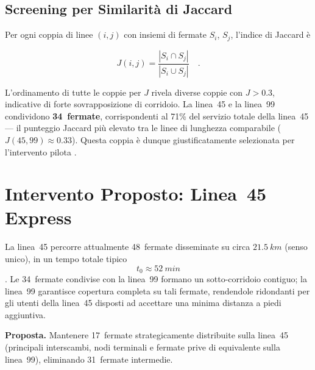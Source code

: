 \documentclass[conference]{IEEEtran}
\begin{document}
\subsection{Screening per Similarità di Jaccard}

Per ogni coppia di linee $(i,j)$ con insiemi di fermate $S_i$,
$S_j$, l'indice di Jaccard è

\begin{equation}
  J(i,j) = \frac{|S_i \cap S_j|}{|S_i \cup S_j|} \quad.
  \label{eq:jaccard}
\end{equation}

L'ordinamento di tutte le coppie per $J$ rivela diverse coppie
con $J > 0.3$, indicative di forte sovrapposizione di corridoio.
La linea~45 e la linea~99 condividono \textbf{34~fermate},
corrispondenti al 71\% del servizio totale della linea~45 — il
punteggio Jaccard più elevato tra le linee di lunghezza comparabile ($J(45,99) \approx 0.33$).
Questa coppia è dunque giustificatamente selezionata per l'intervento pilota \cite{Li2019}.

\section{Intervento Proposto: Linea~45 Express}
\label{sec:intervention}

La linea~45 percorre attualmente 48~fermate disseminate su circa $\SI{21,5}{km}$ (senso unico), in un tempo totale tipico
\[
t_0 \approx \SI{52}{min}
\]
\cite{gtt_gtfs}. Le 34~fermate condivise con la linea~99 formano un sotto-corridoio
contiguo; la linea~99 garantisce copertura completa su tali fermate,
rendendole ridondanti per gli utenti della linea~45 disposti ad
accettare una minima distanza a piedi aggiuntiva.

\textbf{Proposta.} Mantenere 17~fermate strategicamente distribuite
sulla linea~45 (principali interscambi, nodi terminali e fermate
prive di equivalente sulla linea~99), eliminando 31~fermate
intermedie. 
\end{document}
